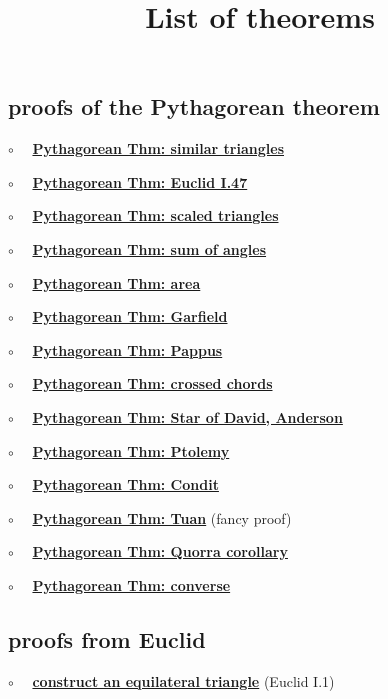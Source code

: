 \documentclass[11pt, oneside]{article}
\title{List of theorems}
\date{}
\begin{document}
\maketitle
\Large


\subsection*{proofs of the Pythagorean theorem}

$\circ$ \ \ \hyperref[sec:Pythagoras_similar_triangles]{\textbf{Pythagorean Thm:  similar triangles}}

$\circ$ \ \ \hyperref[sec:Euclid_I_47]{\textbf{Pythagorean Thm: Euclid I.47 }}

$\circ$ \ \ \hyperref[sec:Pythagoras_scaled_triangles]{\textbf{Pythagorean Thm:  scaled triangles}}

$\circ$ \ \ \hyperref[sec:pthm_sum_angles]{\textbf{Pythagorean Thm:  sum of angles}}

$\circ$ \ \ \hyperref[sec:Pythagoras_area]{\textbf{Pythagorean Thm:  area}}

$\circ$ \ \ \hyperref[sec:Garfield]{\textbf{Pythagorean Thm: Garfield }}

$\circ$ \ \ \hyperref[sec:PProof_Pappus]{\textbf{Pythagorean Thm:  Pappus}}

$\circ$ \ \ \hyperref[sec:PProof_chords]{\textbf{Pythagorean Thm:  crossed chords}}

$\circ$ \ \ \hyperref[sec:star_of_david]{\textbf{Pythagorean Thm:  Star of David, Anderson}}

$\circ$ \ \ \hyperref[sec:PProof_Ptolemy]{\textbf{Pythagorean Thm: Ptolemy }}

$\circ$ \ \ \hyperref[sec:Condit]{\textbf{Pythagorean Thm:  Condit}}

$\circ$ \ \ \hyperref[sec:Pthm_Tuan]{\textbf{Pythagorean Thm:  Tuan}} (fancy proof)

$\circ$ \ \ \hyperref[sec:Quorra]{\textbf{Pythagorean Thm:  Quorra corollary}}

$\circ$ \ \ \hyperref[sec:Pythagorean_theorem_converse]{\textbf{Pythagorean Thm:  converse}}


\subsection*{proofs from Euclid}

$\circ$ \ \ \hyperref[sec:Euclid_I_1]{\textbf{construct an equilateral triangle}} (Euclid I.1)
\end{document}
